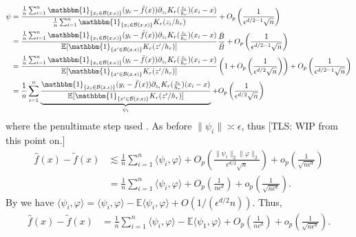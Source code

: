 \documentclass[11pt]{article}
\newcommand{\tls}[1]{{\color{cyan}[TLS: #1]}}
\begin{document}
\begin{align}
    \psi &= \frac{\frac{1}{n}\sum_{i = 1}^n\mathbbm{1}_{\{x_i \in \mathcal{B}(x, \epsilon)\}}(y_i - \bar{f}(x))\partial_{z_i}K_r(\frac{z_i}{h_r})(x_i - x)}{\frac{1}{n}\sum_{i = 1}^n\mathbbm{1}_{\{x_i \in \mathcal{B}(x, \epsilon)\}}K_r(z_i/h_r)} + O_p\left(\frac{1}{\epsilon^{d/2-1}\sqrt{n}}\right) \\
    &= \frac{\frac{1}{n}\sum_{i = 1}^n\mathbbm{1}_{\{x_i \in \mathcal{B}(x, \epsilon)\}}(y_i - \bar{f}(x))\partial_{z_i}K_r(\frac{z_i}{h_r})(x_i - x)}{\mathbb{E}[\mathbbm{1}_{\{x' \in \mathcal{B}(x, \epsilon)\}}K_r(z'/h_r)]}\frac{\bar{B}}{\tilde{B}} + O_p\left(\frac{1}{\epsilon^{d/2-1}\sqrt{n}}\right) \\
    &= \frac{\frac{1}{n}\sum_{i = 1}^n\mathbbm{1}_{\{x_i \in \mathcal{B}(x, \epsilon)\}}(y_i - \bar{f}(x))\partial_{z_i}K_r(\frac{z_i}{h_r})(x_i - x)}{\mathbb{E}[\mathbbm{1}_{\{x' \in \mathcal{B}(x, \epsilon)\}}K_r(z'/h_r)]}\left(1 + O_p\left(\frac{1}{\epsilon^{d/2}\sqrt{n}}\right)\right) + O_p\left(\frac{1}{\epsilon^{d/2-1}\sqrt{n}}\right) \\
    &= \frac{1}{n}\sum_{i = 1}^n\underbrace{\frac{\mathbbm{1}_{\{x_i \in \mathcal{B}(x, \epsilon)\}}(y_i - \bar{f}(x))\partial_{z_i}K_r(\frac{z_i}{h_r})(x_i - x)}{\mathbb{E}[\mathbbm{1}_{\{x' \in \mathcal{B}(x, \epsilon)\}}K_r(z'/h_r)]}}_{\psi_i} + O_p\left(\frac{1}{\epsilon^{d/2}\sqrt{n}}\right)
\end{align}
where the penultimate step used . As before $\|\psi_i\| \asymp \epsilon$, thus \tls{WIP from this point on.} 
\begin{align}
    \hat{f}(x) - \tilde{f}(x) &\lesssim \frac{1}{n}\sum_{i=1}^n\langle\psi_i, \varphi\rangle + O_p\left(\frac{\|\psi_i\|_2\|\varphi\|_2}{\epsilon^{d/2}\sqrt{n}}\right) + o_p\left(\frac{1}{\sqrt{n\epsilon^d}}\right) \\
    &= \frac{1}{n}\sum_{i=1}^n\langle\psi_i, \varphi\rangle + O_p\left(\frac{1}{n\epsilon^{d}}\right) + o_p\left(\frac{1}{\sqrt{n\epsilon^d}}\right).
\end{align}
By  we have $\langle\psi_i, \varphi\rangle = \langle\psi_i, \varphi\rangle -\mathbb{E}\langle\psi_i, \varphi\rangle + O(1/(\epsilon^{d/2} n))$. Thus,
\begin{align}
    \hat{f}(x) - \tilde{f}(x) &= \frac{1}{n}\sum_{i = 1}^n\langle\psi_i, \varphi\rangle - \mathbb{E}\langle\psi_1, \varphi\rangle + O_p\left(\frac{1}{n\epsilon^{d}}\right) + o_p\left(\frac{1}{\sqrt{n\epsilon^d}}\right).
\end{align}
\end{document}
